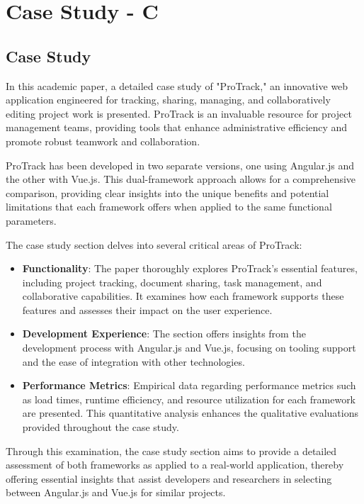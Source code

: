 \chapter{Case Study - C}
\label{cha:Literature}

\section{Case Study}

In this academic paper, a detailed case study of "ProTrack," an innovative web application engineered for tracking, sharing, managing, and collaboratively editing project work is presented. ProTrack is an invaluable resource for project management teams, providing tools that enhance administrative efficiency and promote robust teamwork and collaboration.

ProTrack has been developed in two separate versions, one using Angular.js and the other with Vue.js. This dual-framework approach allows for a comprehensive comparison, providing clear insights into the unique benefits and potential limitations that each framework offers when applied to the same functional parameters.

The case study section delves into several critical areas of ProTrack:
\begin{itemize}
    \item \textbf{Functionality}: The paper thoroughly explores ProTrack's essential features, including project tracking, document sharing, task management, and collaborative capabilities. It examines how each framework supports these features and assesses their impact on the user experience.
    \item \textbf{Development Experience}: The section offers insights from the development process with Angular.js and Vue.js, focusing on tooling support and the ease of integration with other technologies.
    \item \textbf{Performance Metrics}: Empirical data regarding performance metrics such as load times, runtime efficiency, and resource utilization for each framework are presented. This quantitative analysis enhances the qualitative evaluations provided throughout the case study.
\end{itemize}

Through this examination, the case study section aims to provide a detailed assessment of both frameworks as applied to a real-world application, thereby offering essential insights that assist developers and researchers in selecting between Angular.js and Vue.js for similar projects.

